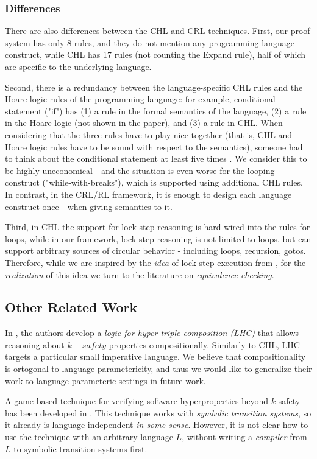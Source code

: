 \subsubsection{Differences}
There are also differences between the CHL and CRL techniques.
First, our proof system has only 8 rules, and they do not mention any programming language construct,
while CHL has 17 rules (not counting the Expand rule), half of which are specific to the underlying language.

Second, there is a redundancy between the language-specific CHL rules and the Hoare logic rules of the
programming language: for example, conditional statement ("if") has (1) a rule in the formal semantics of the language,
(2) a rule in the Hoare logic (not shown in the paper), and (3) a rule in CHL.
When considering that the three rules have to play nice together (that is, CHL and Hoare logic rules have to be sound with respect to the semantics), someone had to think about the conditional statement at least five times .
We consider this to be highly uneconomical
- and the situation
is even worse for the looping construct ("while-with-breaks"), which is supported using additional CHL rules.
In contrast, in the CRL/RL framework, it is enough to design each language construct once - when giving
semantics to it.


Third, in CHL the support for lock-step reasoning is hard-wired into the rules for loops,
while in our framework, lock-step reasoning is not limited to loops, but can support arbitrary sources
of circular behavior - including loops, recursion, gotos.
Therefore, while we are inspired by the \emph{idea} of lock-step execution from \cite{SousaD16},
for the \emph{realization} of this idea we turn to the literature on \emph{equivalence checking}.

\subsection{Other Related Work}

In \cite{DOsualdoFD22}, the authors develop a \emph{logic for hyper-triple composition (LHC)}
that allows reasoning about $k-safety$ properties compositionally.
Similarly to CHL, LHC targets a particular small imperative language.
We believe that compositionality is ortogonal to language-parametericity,
and thus we would like to generalize their work to language-parameteric settings in future work.

A game-based technique for verifying software hyperproperties beyond $k$-safety
has been developed in \cite{BeutnerF22}.
This technique works with \emph{symbolic transition systems},
so it already is language-independent \emph{in some sense}. However, it is not clear how to use the technique
with an arbitrary language $L$, without writing a \emph{compiler} from $L$ to symbolic transition systems first.